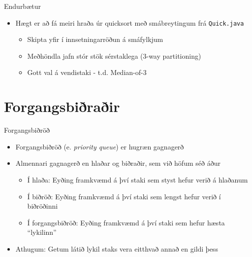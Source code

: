 \documentclass{beamer}
\begin{document}
\begin{frame}{Endurbætur}
	\begin{itemize}
		\item Hægt er að fá meiri hraða úr quicksort með smábreytingum frá \texttt{Quick.java}
		      \begin{itemize}
			      \item Skipta yfir í innsetningarröðun á smáfylkjum
			      \item Meðhöndla jafn stór stök sérstaklega (3-way partitioning)
			      \item Gott val á vendistaki - t.d. Median-of-3
		      \end{itemize}
	\end{itemize}
\end{frame}


\section{Forgangsbiðraðir}

\begin{frame}{Forgangsbiðröð}
	\begin{itemize}
		\item Forgangsbiðröð (e. \emph{priority queue}) er hugræn gagnagerð
		\item Almennari gagnagerð en hlaðar og biðraðir, sem við höfum séð áður
		      \begin{itemize}
			      \item Í hlaða: Eyðing framkvæmd á því staki sem styst hefur verið á hlaðanum
			      \item Í biðröð: Eyðing framkvæmd á því staki sem lengst hefur verið í biðröðinni
			      \item Í forgangsbiðröð: Eyðing framkvæmd á því staki sem hefur hæsta ``lykilinn''
			  \end{itemize}
		\item Athugum: Getum látið lykil staks vera eitthvað annað en gildi þess 
	\end{itemize}
\end{frame}
\end{document}
